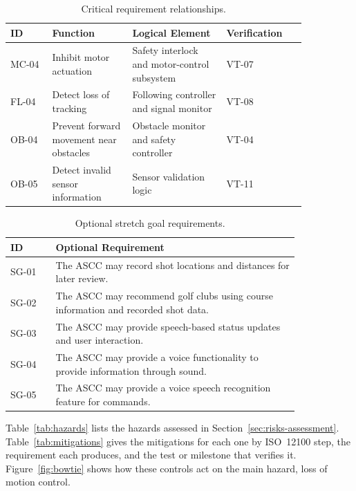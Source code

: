 \begin{table}[H]
\centering
\caption{Critical requirement relationships.}
\label{tab:app-critical-relations}
\footnotesize
\begin{tabular}{p{0.12\linewidth} p{0.23\linewidth} p{0.27\linewidth} p{0.23\linewidth}}
\hline
\textbf{ID} & \textbf{Function} & \textbf{Logical Element} & \textbf{Verification} \\
\hline
MC-04 & Inhibit motor actuation & Safety interlock and motor-control subsystem & VT-07 \\
FL-04 & Detect loss of tracking & Following controller and signal monitor & VT-08 \\
OB-04 & Prevent forward movement near obstacles & Obstacle monitor and safety controller & VT-04 \\
OB-05 & Detect invalid sensor information & Sensor validation logic & VT-11 \\
\hline
\end{tabular}
\end{table}



\begin{table}[H]
\centering
\caption{Optional stretch goal requirements.}
\label{tab:app-stretch}
\footnotesize
\begin{tabular}{p{0.13\linewidth} p{0.70\linewidth}}
\hline
\textbf{ID} & \textbf{Optional Requirement} \\
\hline
SG-01 & The ASCC may record shot locations and distances for later review. \\
SG-02 & The ASCC may recommend golf clubs using course information and recorded shot data. \\
SG-03 & The ASCC may provide speech-based status updates and user interaction. \\
SG-04 & The ASCC may provide a voice functionality to provide information through sound.\\
SG-05 & The ASCC may provide a voice speech recognition feature for commands. \\
\hline
\end{tabular}
\end{table}

\label{app:hazards}

Table~\ref{tab:hazards} lists the hazards assessed in Section~\ref{sec:risks-assessment}. Table~\ref{tab:mitigations} gives the mitigations for each one by ISO~12100 step, the requirement each produces, and the test or milestone that verifies it. Figure~\ref{fig:bowtie} shows how these controls act on the main hazard, loss of motion control.

